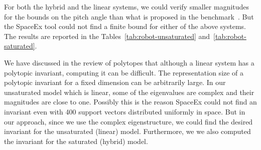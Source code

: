  For both the hybrid and the linear systems, we could
verify smaller magnitudes for the bounds on the pitch angle than what
is proposed in the benchmark~\cite{heinz2014benchmark}.  But the
SpaceEx tool could not find a finite bound for either of the above
systems.  The results are reported in the
Tables~\ref{tab:robot-unsaturated} and~\ref{tab:robot-saturated}.

  We have discussed in the review of polytopes that
although a linear system has a polytopic invariant, computing it can
be difficult.  The representation size of a polytopic invariant for a
fixed dimension can be arbitrarily large.  In our unsaturated model
which is linear, some of the eigenvalues are complex and their
magnitudes are close to one.  Possibly this is the reason SpaceEx
could not find an invariant even with 400 support vectors distributed 
uniformly in space.  But in our approach, since we use the complex
eigenstructure, we could find the desired invariant for the
unsaturated (linear) model.  Furthermore, we we also computed the
invariant for the saturated (hybrid) model.

